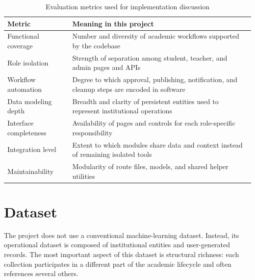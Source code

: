 \documentclass[12pt,a4paper]{report}
\begin{document}
\begin{table}[H]
  \centering
  \caption{Evaluation metrics used for implementation discussion}
  \label{tab:evaluation-metrics}
  \renewcommand{\arraystretch}{1.2}
  \begin{tabularx}{\textwidth}{p{1.8in}Y}
    \toprule
    \textbf{Metric} & \textbf{Meaning in this project} \\
    \midrule
    Functional coverage & Number and diversity of academic workflows supported by the codebase \\
    Role isolation & Strength of separation among student, teacher, and admin pages and APIs \\
    Workflow automation & Degree to which approval, publishing, notification, and cleanup steps are encoded in software \\
    Data modeling depth & Breadth and clarity of persistent entities used to represent institutional operations \\
    Interface completeness & Availability of pages and controls for each role-specific responsibility \\
    Integration level & Extent to which modules share data and context instead of remaining isolated tools \\
    Maintainability & Modularity of route files, models, and shared helper utilities \\
    \bottomrule
  \end{tabularx}
\end{table}

\section{Dataset}
The project does not use a conventional machine-learning dataset. Instead, its operational dataset is composed of institutional entities and user-generated records. The most important aspect of this dataset is structural richness: each collection participates in a different part of the academic lifecycle and often references several others.
\end{document}
